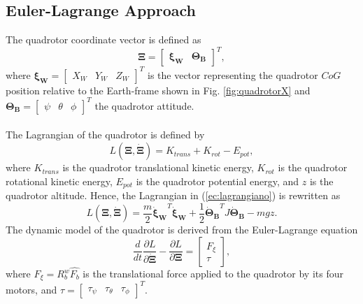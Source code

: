 \subsection{Euler-Lagrange Approach}
The quadrotor coordinate vector is defined as
\begin{equation}
	\mathbf{\Xi}=\begin{bmatrix}
	\mathbf{\xi_W} & \mathbf{\Theta_B}
	\end{bmatrix}^{T},
	\label{ec:coorgenerales}
\end{equation}
where $\mathbf{\xi_W}=\begin{bmatrix}
X_W & Y_W & Z_W
\end{bmatrix}^{T}$ is the vector representing the quadrotor $CoG$ position relative to the Earth-frame shown in Fig. \ref{fig:quadrotorX} and $\mathbf{\Theta_B}=\begin{bmatrix}
\psi & \theta & \phi
\end{bmatrix}^{T}$ the quadrotor attitude.
\\\\
The Lagrangian of the quadrotor is defined by
\begin{equation}
	L(\mathbf{\Xi},\mathbf{\dot{\Xi}})=K_{trans}+K_{rot} - E_{pot},	
	\label{ec:lagrangiano}
\end{equation}
where $ K_{trans}$ is the quadrotor translational kinetic energy, $ K_{rot}$ is the quadrotor rotational kinetic energy, $E_{pot}$ is the quadrotor potential energy, and $z$ is the quadrotor altitude. Hence, the Lagrangian in (\ref{ec:lagrangiano}) is rewritten as
\begin{equation}
	L(\mathbf{\Xi},\mathbf{\dot{\Xi}})=\dfrac{m}{2}\mathbf{\dot{\xi}_W}^{T}\mathbf{\dot{\xi}_W} + \dfrac{1}{2}\mathbf{\dot{\Theta}_B}^{T}J\mathbf{\dot{\Theta}_B} - mgz.
	\label{ec:lagrangiano2}
\end{equation}
The dynamic model of the quadrotor is derived from the Euler-Lagrange equation
\begin{equation}
	\dfrac{d}{dt}\dfrac{\partial L}{\partial \mathbf{\dot{\Xi}}}-\dfrac{\partial L}{\partial \mathbf{\Xi}}=
	\begin{bmatrix}
	F_{\xi}\\
	\tau
	\end{bmatrix},
	\label{ec:eulerlag}
 \end{equation} 
where $F_{\xi}=R_{b}^{w}\hat{F_{b}}$ is the translational force applied to the quadrotor by its four motors, and $\tau = \begin{bmatrix}
\tau_\psi & \tau_\theta & \tau_\phi
\end{bmatrix}^{T}$.

